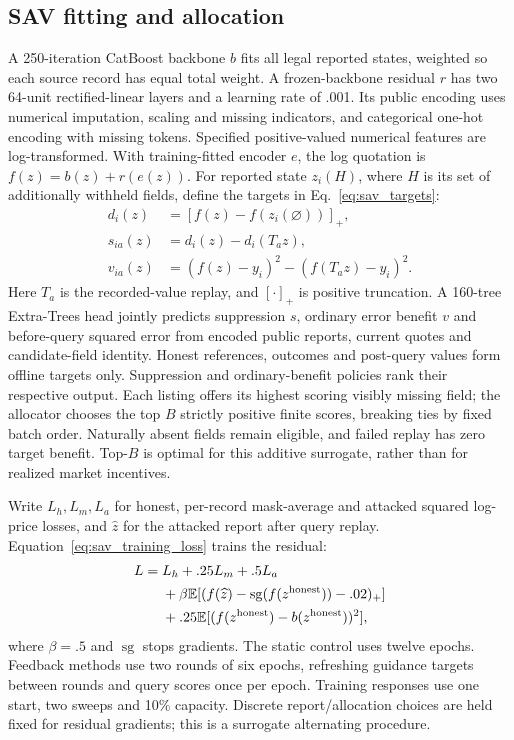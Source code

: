 \documentclass[pdflatex,sn-nature]{sn-jnl}
\begin{document}
\subsection{SAV fitting and allocation}
\label{sec:sav_fitting}
A 250-iteration CatBoost backbone $b$ fits all legal reported states,
weighted so each source record has equal total weight. A frozen-backbone
residual $r$ has two 64-unit rectified-linear layers and a learning rate of .001. Its public
encoding uses numerical imputation, scaling and missing indicators, and
categorical one-hot encoding with missing tokens. Specified positive-valued
numerical features are log-transformed. With training-fitted encoder $e$,
the log quotation is $f(z)=b(z)+r(e(z))$. For reported state $z_i(H)$,
where $H$ is its set of additionally withheld fields, define the targets
in Eq.~\eqref{eq:sav_targets}:
\begin{align}
 d_i(z)&=[f(z)-f(z_i(\varnothing))]_+,\nonumber\\
 s_{ia}(z)&=d_i(z)-d_i(T_a z),\nonumber\\
 v_{ia}(z)&=(f(z)-y_i)^2-(f(T_a z)-y_i)^2.
 \label{eq:sav_targets}
\end{align}
Here $T_a$ is the recorded-value replay, and $[\cdot]_+$ is positive
truncation. A 160-tree Extra-Trees head jointly predicts suppression $s$,
ordinary error benefit $v$ and before-query squared error from encoded public
reports, current quotes and candidate-field identity. Honest references,
outcomes and post-query values form offline targets only. Suppression and
ordinary-benefit policies rank their respective output. Each listing offers
its highest scoring visibly missing field; the allocator chooses the top
$B$ strictly positive finite scores, breaking ties by fixed batch order.
Naturally absent fields remain eligible, and failed replay has zero target
benefit. Top-$B$ is optimal for this additive surrogate, rather than for
realized market incentives.

Write $L_h,L_m,L_a$ for honest, per-record mask-average and attacked
squared log-price losses, and $\widehat z$ for the attacked report after
query replay. Equation~\eqref{eq:sav_training_loss} trains the residual:
\begin{align}
 L={}&L_h+.25L_m+.5L_a\nonumber\\
 &+\beta\mathbb E[(f(\widehat z)-
 \operatorname{sg}(f(z^{\rm honest}))-.02)_+]\nonumber\\
 &+.25\mathbb E[(f(z^{\rm honest})-b(z^{\rm honest}))^2],
 \label{eq:sav_training_loss}
\end{align}
where $\beta=.5$ and $\operatorname{sg}$ stops gradients.
The static control uses twelve epochs. Feedback methods use two rounds of
six epochs, refreshing guidance targets between rounds and query scores
once per epoch. Training responses use one start, two sweeps and 10\%
capacity. Discrete report/allocation choices are held fixed for residual
gradients; this is a surrogate alternating procedure.
\end{document}

